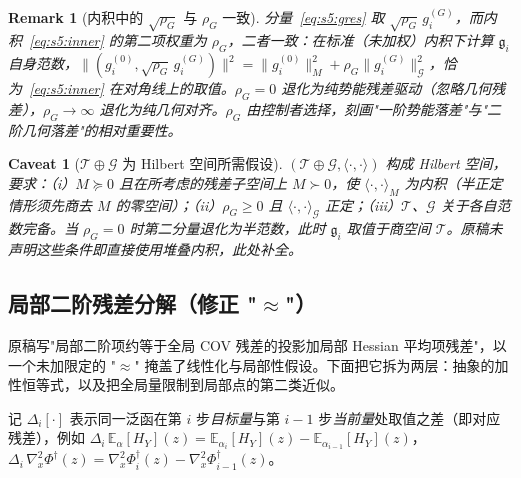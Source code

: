 \documentclass[11pt,a4paper]{article}
\newtheorem{remark}[theorem]{Remark}
\newtheorem{caveat}[theorem]{Caveat}
\newcommand{\E}{\mathbb{E}}
\newcommand{\cG}{\mathcal{G}}   %
\newcommand{\cT}{\mathcal{T}}   %
\newcommand{\gres}{\bm{\mathfrak{g}}} %
\begin{document}
\begin{remark}[内积中的 $\sqrt{\rho_G}$ 与 $\rho_G$ 一致]\label{rem:s5:weight}
分量~\eqref{eq:s5:gres} 取 $\sqrt{\rho_G}\,g_i^{(G)}$，而内积~\eqref{eq:s5:inner} 的第二项权重为 $\rho_G$，二者一致：在标准（未加权）内积下计算 $\gres_i$ 自身范数，$\|(g_i^{(0)},\sqrt{\rho_G}\,g_i^{(G)})\|^2=\|g_i^{(0)}\|_M^2+\rho_G\|g_i^{(G)}\|_{\cG}^2$，恰为~\eqref{eq:s5:inner} 在对角线上的取值。$\rho_G=0$ 退化为纯势能残差驱动（忽略几何残差），$\rho_G\to\infty$ 退化为纯几何对齐。$\rho_G$ 由控制者选择，刻画"一阶势能落差"与"二阶几何落差"的相对重要性。
\end{remark}

\begin{caveat}[$\cT\oplus\cG$ 为 Hilbert 空间所需假设]\label{cav:s5:hilbert}
$(\cT\oplus\cG,\langle\cdot,\cdot\rangle)$ 构成 Hilbert 空间，要求：（i）$M\succeq 0$ 且在所考虑的残差子空间上 $M\succ 0$，使 $\langle\cdot,\cdot\rangle_M$ 为内积（半正定情形须先商去 $M$ 的零空间）；（ii）$\rho_G\ge 0$ 且 $\langle\cdot,\cdot\rangle_{\cG}$ 正定；（iii）$\cT$、$\cG$ 关于各自范数完备。当 $\rho_G=0$ 时第二分量退化为半范数，此时 $\gres_i$ 取值于商空间 $\cT$。原稿未声明这些条件即直接使用堆叠内积，此处补全。
\end{caveat}

\subsection{局部二阶残差分解（修正 "$\approx$"）}

原稿写"局部二阶项约等于全局 COV 残差的投影加局部 Hessian 平均项残差"，以一个未加限定的 "$\approx$" 掩盖了线性化与局部性假设。下面把它拆为两层：抽象的加性恒等式，以及把全局量限制到局部点的第二类近似。

记 $\Delta_i[\cdot]$ 表示同一泛函在第 $i$ 步\emph{目标量}与第 $i-1$ 步\emph{当前量}处取值之差（即对应残差），例如 $\Delta_i\,\E_{\alpha}[H_Y](z)=\E_{\alpha_i}[H_Y](z)-\E_{\alpha_{i-1}}[H_Y](z)$，$\Delta_i\,\nabla_x^2\Phi^\dagger(z)=\nabla_x^2\Phi_i^\dagger(z)-\nabla_x^2\Phi_{i-1}^\dagger(z)$。
\end{document}
